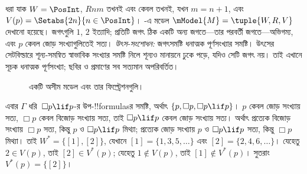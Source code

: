 \documentclass[../../../include/open-logic-section]{subfiles}
\begin{document}
\begin{ex}
  ধরা যাক $W = \PosInt$, $Rnm$ তখনই এবং কেবল তখনই, যখন $m = n + 1$, এবং $V(p) = \Setabs{2n}{n \in
    \PosInt}$। -এ মডেল $\mModel{M} = \tuple{W, R, V}$ দেখানো হয়েছে। জগৎগুলি $1$, $2$ ইত্যাদি; প্রতিটি জগৎ ঠিক একটি অন্য জগতে—তার পরবর্তী জগতে—অভিগম্য, এবং $p$ কেবল জোড় সংখ্যাগুলিতেই সত্য।
\emph{উৎস-সংশোধন:} জগৎসমষ্টি ধনাত্মক পূর্ণসংখ্যার সমষ্টি। উৎসের সেটবিল্ডারে শূন্য-সমন্বিত স্বাভাবিক সংখ্যার সমষ্টি নিলে শূন্যও মানায়নে ঢুকে পড়ে, যদিও সেটি জগৎ নয়। তাই এখানে সূচক ধনাত্মক পূর্ণসংখ্যা; ছবির ও প্রমাণের সব সত্যমান অপরিবর্তিত।


  \begin{figure}
    \centering

    \caption{একটি অসীম মডেল এবং তার ফিল্ট্রেশনগুলি।}
  \end{figure}

  এবার $\Gamma$ ধরি~$\Box p \lif p$-র উপ-!!{formula}sর সমষ্টি, অর্থাৎ $\{p, \Box p, \Box p \lif p\}$। $p$ কেবল জোড় সংখ্যায় সত্য, $\Box p$ কেবল বিজোড় সংখ্যায় সত্য, তাই $\Box p \lif p$ কেবল জোড় সংখ্যায় সত্য। অর্থাৎ প্রত্যেক বিজোড় সংখ্যায় $\Box p$ সত্য, কিন্তু $p$ ও $\Box
  p \lif p$ মিথ্যা; প্রত্যেক জোড় সংখ্যায় $p$ ও $\Box p \lif p$ সত্য, কিন্তু $\Box p$ মিথ্যা। তাই $W^* = \{ [1], [2] \}$, যেখানে $[1] =
  \{1, 3, 5, \dots\}$ এবং $[2] = \{2, 4, 6, \dots\}$। যেহেতু $2 \in
  V(p)$, তাই $[2] \in V^*(p)$; যেহেতু $1 \notin V(p)$, তাই $[1] \notin
  V^*(p)$। সুতরাং $V^*(p) = \{[2]\}$।


\end{ex}
\end{document}
